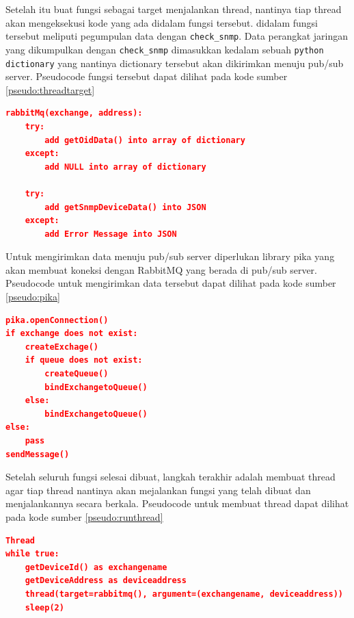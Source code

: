     			Setelah itu buat fungsi sebagai target menjalankan thread, nantinya tiap thread akan mengeksekusi kode yang ada didalam fungsi tersebut. didalam fungsi tersebut meliputi pegumpulan data dengan \texttt{check\_snmp}. Data perangkat jaringan yang dikumpulkan dengan \texttt{check\_snmp} dimasukkan kedalam sebuah \texttt{python dictionary} yang nantinya dictionary tersebut akan dikirimkan menuju pub/sub server. Pseudocode fungsi tersebut dapat dilihat pada kode sumber \ref{pseudo:threadtarget}
    			
\begin{lstlisting}[frame=single,breaklines,caption={Pseudocode Target \textit{Thread} Untuk Mengambil Data Perangkat},label=pseudo:threadtarget, captionpos=b, language=json]
rabbitMq(exchange, address):
	try:
		add getOidData() into array of dictionary
	except:
		add NULL into array of dictionary
	
	try:
		add getSnmpDeviceData() into JSON
	except:
		add Error Message into JSON		
\end{lstlisting}
    			
    			Untuk mengirimkan data menuju pub/sub server diperlukan library pika yang akan membuat koneksi dengan RabbitMQ yang berada di pub/sub server. Pseudocode untuk mengirimkan data tersebut dapat dilihat pada kode sumber \ref{pseudo:pika}
    			
\begin{lstlisting}[frame=single,breaklines,caption={Pseudocode Pengiriman Data Dengan Pika},label=pseudo:pika, captionpos=b, language=json]
pika.openConnection()
if exchange does not exist:
	createExchage()
	if queue does not exist:
		createQueue()
		bindExchangetoQueue()
	else:
		bindExchangetoQueue()
else:
	pass
sendMessage()
\end{lstlisting}
    			
				Setelah seluruh fungsi selesai dibuat, langkah terakhir adalah membuat thread agar tiap thread nantinya akan mejalankan fungsi yang telah dibuat dan menjalankannya secara berkala. Pseudocode untuk membuat thread dapat dilihat pada kode sumber \ref{pseudo:runthread}
				
\begin{lstlisting}[frame=single,breaklines,caption={Pseudocode Menjalankan Thread},label=pseudo:runthread, captionpos=b, language=json]
Thread
while true:
	getDeviceId() as exchangename
	getDeviceAddress as deviceaddress
	thread(target=rabbitmq(), argument=(exchangename, deviceaddress))
	sleep(2)

\end{lstlisting}

